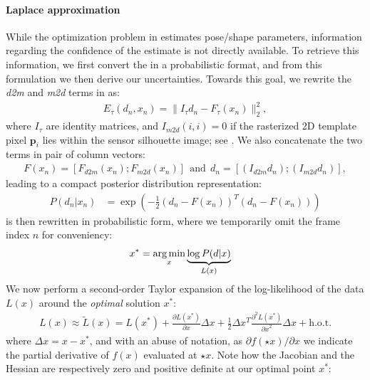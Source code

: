 
\paragraph{Laplace approximation}
\label{sec:posterior}
While the optimization problem in  estimates pose/shape parameters, information regarding the confidence of the estimate is not directly available. To retrieve this information, we first convert the  in a probabilistic format, and from this formulation we then derive our uncertainties. 
% 
Towards this goal, we rewrite the \emph{d2m} and \emph{m2d} terms in  as:
% 
\begin{align}
E_{\tau}(d_n, x_n) = \|I_{\tau} d_n - F_{\tau} (x_n)\|_2^2,
\end{align} 
where $I_\tau$ are identity matrices, and $I_{m2d}(i,i)=0$ if the rasterized 2D template pixel $\mathbf{p}_i$ lies within the sensor silhouette image; see \cite{htrack}. We also concatenate the two terms in pair of column vectors:
% 
\begin{align*}
F(x_n) = \left[F_{d2m}(x_n); F_{m2d}(x_n)\right] 
\:\:\text{and}\:\: 
d_n = \left[(I_{d2m} d_n); (I_{m2d} d_n) \right],
\end{align*}
% 
leading to a compact posterior distribution representation:
% 
\begin{align}
P(d_n|x_n) &= \exp \left( - \tfrac{1}{2}(d_n - F(x_n))^T (d_n - F(x_n)) \right)
\label{eq:posterior}
\end{align}
% 
 is then rewritten in probabilistic form, where we temporarily omit the frame index $n$ for conveniency:
%
\begin{align}
x^* &= \operatorname*{arg\,min}_{x} \underbrace{\log  P(d|x)}_{L(x)}
\label{eq:independent}
\end{align}
%
We now perform a second-order Taylor expansion of the log-likelihood of the data $L(x)$ around the \emph{optimal} solution $x^*$:
%
\begin{align}
L(x) \approx \tilde{L}(x) = L(x^*)   
+ \tfrac{\partial L(x^*) }{\partial x}  \Delta x 
+ \tfrac{1}{2} \Delta x^T\tfrac{\partial^2 L(x^*)}{{\partial x}^2} \Delta x + \text{h.o.t.}
\label{eq:taylor}
\end{align}
%
where $\Delta x=x - x^*$, and with an abuse of notation, as $\partial f(\star{x})/\partial x$ we indicate the partial derivative of $f(x)$ evaluated at $\star{x}$. Note how the Jacobian and the Hessian are respectively zero and positive definite at our optimal point $x^*$:
